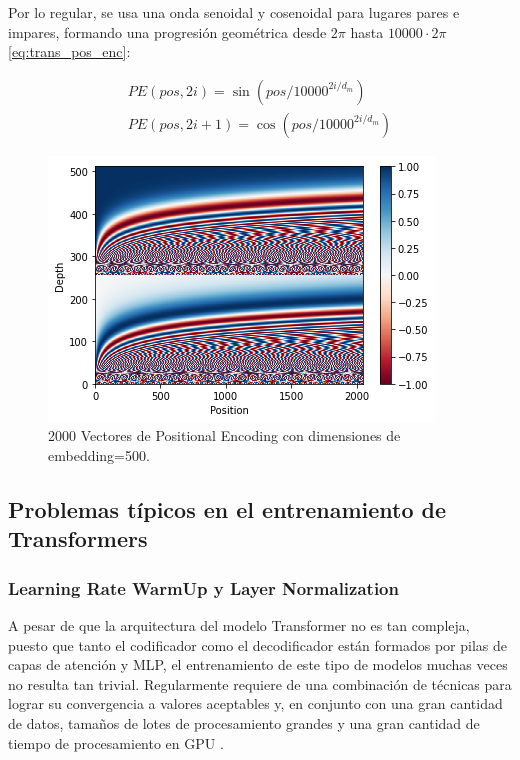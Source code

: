 Por lo regular, se usa una onda senoidal y cosenoidal para lugares pares e impares, formando una
progresión geométrica desde $2\pi$ hasta $10000 \cdot 2\pi$ \ref{eq:trans_pos_enc}:


\begin{equation}
    \begin{split}
        PE(pos, 2i) = \sin(pos/10000^{2i/d_m})\\
        PE(pos, 2i+1) = \cos(pos/10000^{2i/d_m})
    \end{split}
    \label{eq:trans_pos_enc}
\end{equation}


\begin{figure}[ht!]
    \centering
    \includegraphics[width=0.5 \textwidth]{Chapters/2. Transformer/Figures/transformer/pos_enc.png}
    \caption{2000 Vectores de Positional Encoding con dimensiones de embedding=500.}
    \label{fig:trans_pos_enc}
\end{figure}


\subsection{Problemas típicos en el entrenamiento de Transformers}

\subsubsection{Learning Rate WarmUp y Layer Normalization}

A pesar de que la arquitectura del modelo Transformer no es tan compleja, puesto que tanto el
codificador como el decodificador están formados por pilas de capas de atención y MLP, el
entrenamiento de este tipo de modelos muchas veces no resulta tan trivial. Regularmente requiere de
una combinación de técnicas para lograr su convergencia a valores aceptables y, en conjunto con una
gran cantidad de datos, tamaños de lotes de procesamiento grandes y una gran cantidad de tiempo de
procesamiento en GPU \cite{DBLP:journals/corr/abs-1804-00247}.

